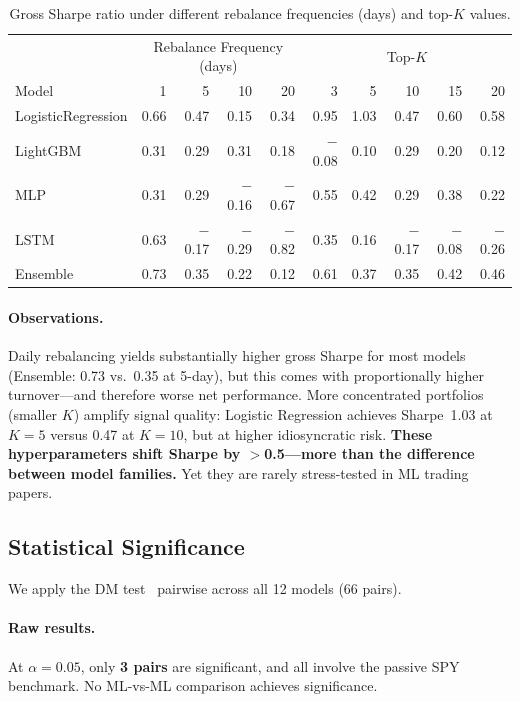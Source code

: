\documentclass[11pt]{article}
\begin{document}
\begin{table}[H]
\centering
\caption{Gross Sharpe ratio under different rebalance frequencies (days) and top-$K$ values.}
\label{tab:sensitivity}
\footnotesize
\begin{tabular}{l r r r r | r r r r r}
\toprule
 & \multicolumn{4}{c|}{Rebalance Frequency (days)} & \multicolumn{5}{c}{Top-$K$} \\
Model & 1 & 5 & 10 & 20 & 3 & 5 & 10 & 15 & 20 \\
\midrule
LogisticRegression & 0.66 & 0.47 & 0.15 & 0.34 & 0.95 & 1.03 & 0.47 & 0.60 & 0.58 \\
LightGBM           & 0.31 & 0.29 & 0.31 & 0.18 & $-$0.08 & 0.10 & 0.29 & 0.20 & 0.12 \\
MLP                & 0.31 & 0.29 & $-$0.16 & $-$0.67 & 0.55 & 0.42 & 0.29 & 0.38 & 0.22 \\
LSTM               & 0.63 & $-$0.17 & $-$0.29 & $-$0.82 & 0.35 & 0.16 & $-$0.17 & $-$0.08 & $-$0.26 \\
Ensemble           & 0.73 & 0.35 & 0.22 & 0.12 & 0.61 & 0.37 & 0.35 & 0.42 & 0.46 \\
\bottomrule
\end{tabular}
\end{table}

\paragraph{Observations.}
Daily rebalancing yields substantially higher gross Sharpe for most models (Ensemble: 0.73 vs.\ 0.35 at 5-day), but this comes with proportionally higher turnover---and therefore worse net performance.
More concentrated portfolios (smaller $K$) amplify signal quality: Logistic Regression achieves Sharpe~1.03 at $K=5$ versus 0.47 at $K=10$, but at higher idiosyncratic risk.
\textbf{These hyperparameters shift Sharpe by $>$0.5---more than the difference between model families.}
Yet they are rarely stress-tested in ML trading papers.

\subsection{Statistical Significance}

We apply the DM test~\citep{ref_dm} pairwise across all 12 models (66 pairs).

\paragraph{Raw results.}
At $\alpha = 0.05$, only \textbf{3 pairs} are significant, and all involve the passive SPY benchmark.
No ML-vs-ML comparison achieves significance.
\end{document}
